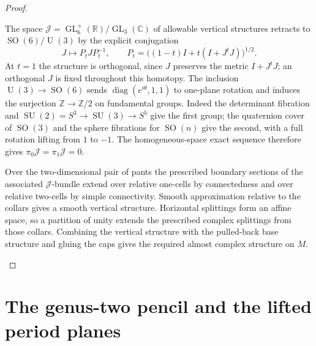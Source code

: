 \begin{proof}
\begin{enumerate}[label=\arabic*.,leftmargin=*]
The space $\mathcal J=\operatorname{GL}_6^+(\mathbb R)/
\operatorname{GL}_3(\mathbb C)$ of allowable vertical structures
retracts to $\operatorname{SO}(6)/\operatorname{U}(3)$ by the explicit
conjugation
\[
 J\longmapsto P_tJP_t^{-1},
 \qquad P_t=\bigl((1-t)I+t(I+J^tJ)\bigr)^{1/2}.
\]
At $t=1$ the structure is orthogonal, since $J$ preserves the metric
$I+J^tJ$; an orthogonal $J$ is fixed throughout this homotopy.
The inclusion $\operatorname{U}(3)\to\operatorname{SO}(6)$ sends
$\operatorname{diag}(e^{i\theta},1,1)$ to one-plane rotation and
induces the surjection $\mathbb Z\to\mathbb Z/2$ on fundamental
groups. Indeed the determinant fibration and
$\operatorname{SU}(2)=S^3\to\operatorname{SU}(3)\to S^5$ give the
first group; the quaternion cover of $\operatorname{SO}(3)$ and
the sphere fibrations for $\operatorname{SO}(n)$ give the second,
with a full rotation lifting from $1$ to $-1$. The homogeneous-space
exact sequence therefore gives $\pi_0\mathcal J=\pi_1\mathcal J=0$.

Over the two-dimensional pair of pants the prescribed boundary
sections of the associated $\mathcal J$-bundle extend over relative
one-cells by connectedness and over relative two-cells by simple
connectivity. Smooth approximation relative to the collars gives
a smooth vertical structure. Horizontal splittings form an affine
space, so a partition of unity extends the prescribed complex
splittings from those collars. Combining the vertical structure with
the pulled-back base structure and gluing the caps gives the required
almost complex structure on $M$.

\end{enumerate}
\end{proof}

\section{The genus-two pencil and the lifted period planes}



